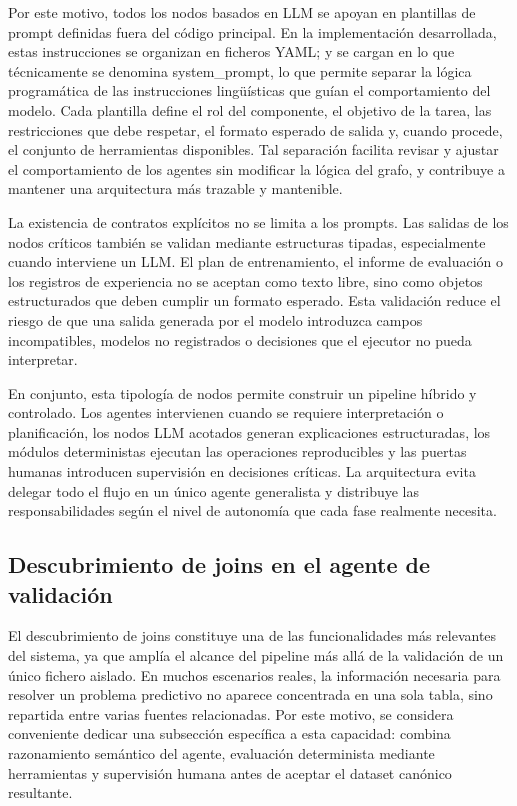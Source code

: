 \documentclass[12pt,a4paper]{article}
\theoremstyle{plain}
\begin{document}
Por este motivo, todos los nodos basados en LLM se apoyan en plantillas de prompt definidas fuera del código principal. En la implementación desarrollada, estas instrucciones se organizan en ficheros YAML; y se cargan en lo que técnicamente se denomina system\_prompt, lo que permite separar la lógica programática de las instrucciones lingüísticas que guían el comportamiento del modelo. Cada plantilla define el rol del componente, el objetivo de la tarea, las restricciones que debe respetar, el formato esperado de salida y, cuando procede, el conjunto de herramientas disponibles. Tal separación facilita revisar y ajustar el comportamiento de los agentes sin modificar la lógica del grafo, y contribuye a mantener una arquitectura más trazable y mantenible.

La existencia de contratos explícitos no se limita a los prompts. Las salidas de los nodos críticos también se validan mediante estructuras tipadas, especialmente cuando interviene un LLM. El plan de entrenamiento, el informe de evaluación o los registros de experiencia no se aceptan como texto libre, sino como objetos estructurados que deben cumplir un formato esperado. Esta validación reduce el riesgo de que una salida generada por el modelo introduzca campos incompatibles, modelos no registrados o decisiones que el ejecutor no pueda interpretar.

En conjunto, esta tipología de nodos permite construir un pipeline híbrido y controlado. Los agentes intervienen cuando se requiere interpretación o planificación, los nodos LLM acotados generan explicaciones estructuradas, los módulos deterministas ejecutan las operaciones reproducibles y las puertas humanas introducen supervisión en decisiones críticas. La arquitectura evita delegar todo el flujo en un único agente generalista y distribuye las responsabilidades según el nivel de autonomía que cada fase realmente necesita.

\subsection{Descubrimiento de joins en el agente de validación}
\label{sec:join-discovery-arquitectura}

El descubrimiento de joins constituye una de las funcionalidades más relevantes del sistema, ya que amplía el alcance del pipeline más allá de la validación de un único fichero aislado. En muchos escenarios reales, la información necesaria para resolver un problema predictivo no aparece concentrada en una sola tabla, sino repartida entre varias fuentes relacionadas. Por este motivo, se considera conveniente dedicar una subsección específica a esta capacidad: combina razonamiento semántico del agente, evaluación determinista mediante herramientas y supervisión humana antes de aceptar el dataset canónico resultante.
\end{document}
